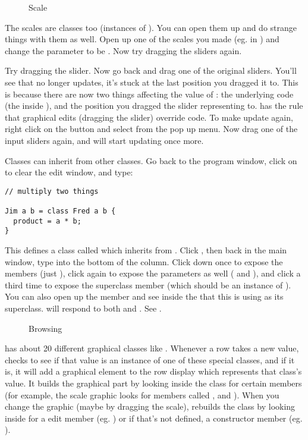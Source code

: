 \begin{figure}
\caption{Scale }
\end{figure}

The scales are classes too (instances of ). You can open them up
and do strange things with them as well. Open up one of the scales you made
(eg.  in ) and change the  parameter to
be . Now try dragging the sliders again.

Try dragging the  slider. Now go back and drag one of the
original sliders.  You'll see that  no longer updates, it's stuck
at the last position you dragged it to. This is because there are now two
things affecting the value of : the underlying code (the  inside ), and the position you dragged the slider representing
 to. \nip{} has the rule that graphical edits (dragging the slider)
override code. To make  update again, right click on the 
button and select  from the pop up menu. Now drag one of
the input sliders again, and  will start updating once more.

Classes can inherit from other classes. Go back to the program window,
click on  to clear the edit window, and type:

\begin{verbatim}
// multiply two things
 
Jim a b = class Fred a b {
  product = a * b;
}
\end{verbatim}

This defines a class called  which inherits from . Click
, then back in
the main window, type  into the bottom of the column. Click down
once to expose the members (just ), click again to expose the
parameters as well ( and ), and click a third time to expose
the superclass member (which should be an instance of ). You can
also open up the  member and see inside the  that this
 is using as its superclass. 
 will respond to both  and . 
See .

\begin{figure}
\caption{Browsing }
\end{figure}

\nip{} has about 20 different graphical classes like . Whenever a
row takes a new value, \nip{} checks to see if that value is an instance of
one of these special classes, and if it is, it will add a graphical element to
the row display which represents that class's value. It builds the graphical
part by looking inside the class for certain members (for example, the scale
graphic looks for members called ,  and ). When
you change the graphic (maybe by dragging the scale), \nip{} rebuilds
the class by looking inside for a edit member (eg. )
or if that's not defined, a constructor member (eg. ).

